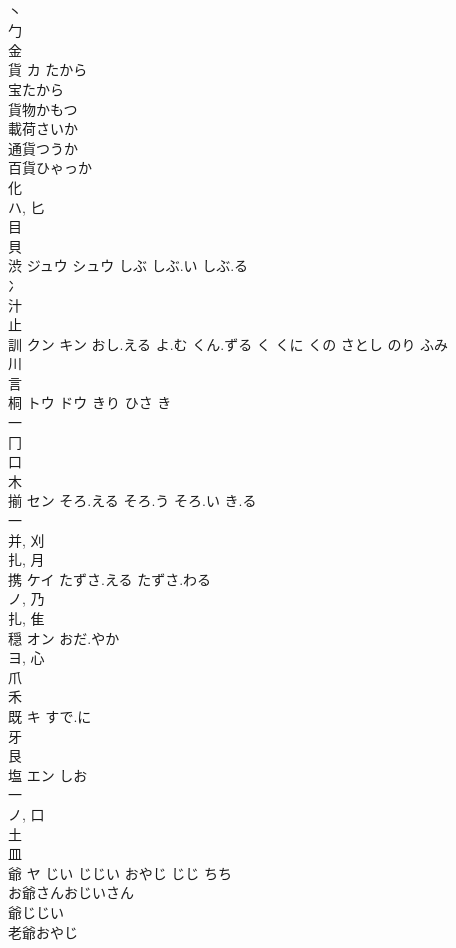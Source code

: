 \documentclass[8pt]{extreport}
\begin{document}
\begin{CJK}{UTF8}{min}
\\	丶 
\\	勹 
\\	金 
\\	貨	カ	たから	
\\	宝たから
\\	貨物かもつ
\\	載荷さいか
\\	通貨つうか
\\	百貨ひゃっか
\\	化 
\\	ハ, 匕 
\\	目 
\\	貝 
\\	渋	ジュウ シュウ	しぶ しぶ.い しぶ.る	
\\	冫 
\\	汁 
\\	止 
\\	訓	クン キン	おし.える よ.む くん.ずる く くに くの さとし のり ふみ	
\\	川 
\\	言 
\\	桐	トウ ドウ	きり ひさ き	
\\	一 
\\	冂 
\\	口 
\\	木 
\\	揃	セン	そろ.える そろ.う そろ.い き.る	
\\	一 
\\	并, 刈 
\\	扎, 月 
\\	携	ケイ	たずさ.える たずさ.わる	
\\	ノ, 乃 
\\	扎, 隹 
\\	穏	オン	おだ.やか	
\\	ヨ, 心 
\\	爪 
\\	禾 
\\	既	キ	すで.に	
\\	牙 
\\	艮 
\\	塩	エン	しお	
\\	一 
\\	ノ, 口 
\\	土 
\\	皿 
\\	爺	ヤ	じい じじい おやじ じじ ちち	
\\	お爺さんおじいさん
\\	爺じじい
\\	老爺おやじ

\end{CJK}
\end{document}
